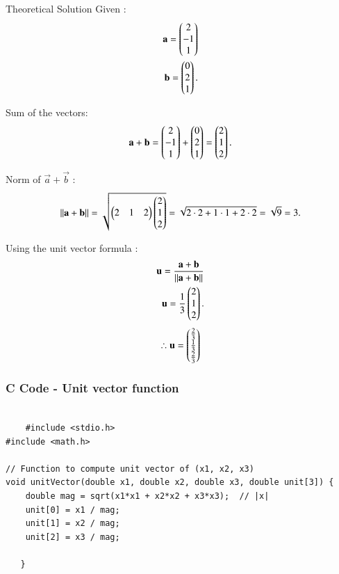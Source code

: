 \documentclass{beamer}
\begin{document}
	\begin{frame}{Theoretical Solution}
Given :
\begin{align}
\mathbf{a} = \begin{pmatrix} 2 \\ -1 \\ 1 \end{pmatrix}\\ 
\mathbf{b} = \begin{pmatrix} 0 \\ 2 \\ 1 \end{pmatrix}.
\end{align}

Sum of the vectors:
\begin{align}
\mathbf{a}+\mathbf{b} = \begin{pmatrix} 2 \\ -1 \\ 1 \end{pmatrix} + \begin{pmatrix} 0 \\ 2 \\ 1 \end{pmatrix}
= \begin{pmatrix} 2 \\ 1 \\ 2 \end{pmatrix}.
\end{align}

Norm of $\vec{a}+\vec{b}$ :
\begin{align}
\|\mathbf{a}+\mathbf{b}\| = \sqrt{ \begin{pmatrix} 2 & 1 & 2 \end{pmatrix} 
\begin{pmatrix} 2 \\ 1 \\ 2 \end{pmatrix} }
= \sqrt{ 2\cdot 2 + 1\cdot 1 + 2\cdot 2 }
= \sqrt{9} = 3.
\end{align}
\end{frame}
\begin{frame}
Using the unit vector formula :
\begin{align}
\mathbf{u} = \frac{\mathbf{a}+\mathbf{b}}{\|\mathbf{a}+\mathbf{b}\|}\\
\mathbf{u}= \frac{1}{3} \begin{pmatrix} 2 \\ 1 \\ 2 \end{pmatrix}.
\end{align}
\begin{align}
\therefore
\mathbf{u} = \begin{pmatrix}\frac{2}{3} \\  \frac{1}{3} \\ \frac{2}{3} \end{pmatrix}
\end{align}

\end{frame}
\begin{frame}[fragile]
		\frametitle{C Code - Unit vector function }
		
		\begin{lstlisting}

    #include <stdio.h>
#include <math.h>

// Function to compute unit vector of (x1, x2, x3)
void unitVector(double x1, double x2, double x3, double unit[3]) {
    double mag = sqrt(x1*x1 + x2*x2 + x3*x3);  // |x|
    unit[0] = x1 / mag;
    unit[1] = x2 / mag;
    unit[2] = x3 / mag;

   }
            \end{lstlisting}
            \end{frame}
\end{document}
